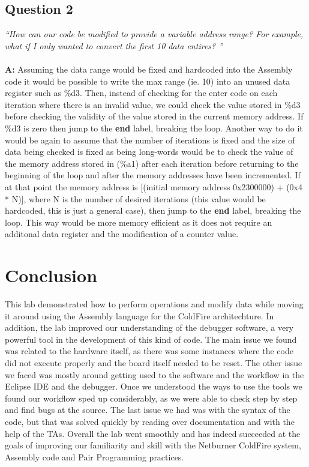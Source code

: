 \documentclass[letterpaper]{article}
\begin{document}
    \subsection{Question 2}
      \textit{``How can our code be modified to provide a variable address range? For example, what if I only wanted to convert the first 10 data entires? ''}
      \\ \\
      \noindent\textbf{A:}
      Assuming the data range would be fixed and hardcoded into the Assembly code it would be possible to
      write the max range (ie. 10) into an unused data register such as \%d3.  Then, instead of checking
      for the enter code on each iteration where there is an invalid value, we could check the value stored in
      \%d3 before checking the validity of the value stored in the current memory address.  If \%d3 is
      zero then jump to the \textbf{end} label, breaking the loop.  Another way to do it would be again
      to assume that the number of iterations is fixed and the size of data being checked is fixed as being
      long-words would be to check the value of the memory address stored in (\%a1) after each iteration
      before returning to the beginning of the loop and after the memory addresses have been incremented.
      If at that point the memory address is [(initial memory address 0x2300000) + (0x4 * N)], where N is
      the number of desired iterations (this value would be hardcoded, this is just a general case), then
      jump to the \textbf{end} label, breaking the loop.  This way would be more memory efficient as it
      does not require an additonal data register and the modification of a counter value.

\section{Conclusion}
  This lab demonstrated how to perform operations
  and modify data while moving it around using the Assembly language for the ColdFire architechture.
  In addition, the lab improved our understanding of the debugger software, a very powerful
  tool in the development of this kind of code.  The main issue we found was related
  to the hardware itself, as there was some instances where the code did not execute
  properly and the board itself needed to be reset.  The other issue we faced was mostly
  around getting used to the software and the workflow in the Eclipse IDE and
  the debugger.  Once we understood the ways to use the tools we found our workflow sped up
  considerably, as we were able to check step by step and find bugs at the source.  The last
  issue we had was with the syntax of the code, but that was solved quickly by reading over
  documentation and with the help of the TAs.  Overall the lab went smoothly and has indeed
  succeeded at the goals of improving our familiarity and skill with the Netburner ColdFire system,
  Assembly code and Pair Programming practices.
\end{document}
